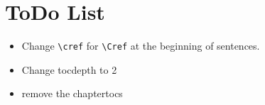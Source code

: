 \chapter*{ToDo List}

\begin{itemize}
    \tightlist
    \item Change \verb|\cref| for \verb|\Cref| at the beginning of sentences.
    \item Change tocdepth to 2
    \item remove the chaptertocs
\end{itemize}